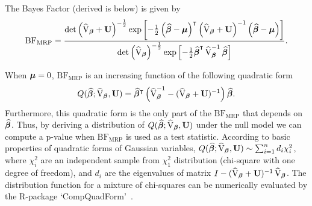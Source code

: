 The Bayes Factor (derived is below) is given by
$$\textrm{BF}_{\textrm{MRP}} = \frac{\det\left(\widehat{\mathbf{\textrm{V}}}_{{\boldsymbol {\beta}}} + \mathbf{U} \right)^{-\frac{1}{2}}
\exp\left[-\frac{1}{2}\left({\boldsymbol {\widehat{\beta}} - {\boldsymbol \mu}}\right)^{\intercal}\left(\widehat{\mathbf{\textrm{V}}}_{{\boldsymbol {\beta}}} + \mathbf{U}\right)^{-1}\left({\boldsymbol {\widehat{\beta}}} - {\boldsymbol \mu}\right)\right]}
{\det \left( \widehat{\mathbf{\textrm{V}}}_{\boldsymbol {\beta}}\right)^{-\frac{1}{2}}\exp \left[-\frac{1}{2}{\boldsymbol {\widehat{\beta}}}^{\intercal}\, \widehat{\mathbf{\textrm{V}}}_{\boldsymbol {\beta}}^{-1} 
\,{\boldsymbol {\widehat{\beta}}}\right]}.$$


When $\boldsymbol \mu=0$, $\textrm{BF}_{\textrm{MRP}}$ is an increasing function of the following quadratic form
\begin{equation}\label{quadratic_form}
Q(\boldsymbol{\widehat{\beta}};\widehat{\mathbf{\textrm{V}}}_{{\boldsymbol {\beta}}},\mathbf{U})=
\boldsymbol{\widehat{\beta}^\intercal} \left(\widehat{\mathbf{\textrm{V}}}_{{\boldsymbol {\beta}}}^{-1} - (\widehat{\mathbf{\textrm{V}}}_{{\boldsymbol {\beta}}}+\mathbf{U})^{-1}\right) \boldsymbol{\widehat{\beta}}.
\end{equation}
Furthermore, this quadratic form is the only part of the $\textrm{BF}_{\textrm{MRP}}$ that depends on $\boldsymbol {\widehat{\beta}}$.
Thus, by deriving a distribution of $Q(\boldsymbol{\widehat{\beta}};\widehat{\mathbf{\textrm{V}}}_{{\boldsymbol {\beta}}},\mathbf{U})$
under the null model we can compute a p-value when $\textrm{BF}_{\textrm{MRP}}$ is used as a test statistic.
According to basic properties of quadratic forms of Gaussian variables,
$Q(\boldsymbol{\widehat{\beta}};\widehat{\mathbf{\textrm{V}}}_{{\boldsymbol {\beta}}},\mathbf{U}) \sim \sum_{i=1}^n d_i \chi^2_i$, where $\chi_i^2$
are an independent sample from $\chi_1^2$ distribution (chi-square with one degree of freedom),
and $d_i$ are the eigenvalues of matrix
$I-(\widehat{\mathbf{\textrm{V}}}_{{\boldsymbol {\beta}}}+\mathbf{U})^{-1}\, \widehat{\mathbf{\textrm{V}}}_{{\boldsymbol {\beta}}}$.
The distribution function for a mixture of chi-squares can be numerically evaluated by
the R-package `CompQuadForm'~\cite{Duchesne2010}.

